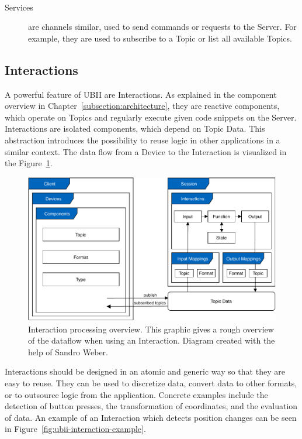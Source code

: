 \begin{description}
  \item[Services] are channels similar, used to send commands or requests to the Server. For example, they are used to subscribe to a Topic or list all available Topics.
\end{description}


\subsection{Interactions}\label{subsection:interactions}
A powerful feature of \ac{UBII} are Interactions. As explained in the component overview in Chapter~\ref{subsection:architecture}, they are reactive components, which operate on Topics and regularly execute given code snippets on the Server. Interactions are isolated components, which depend on Topic Data. This abstraction introduces the possibility to reuse logic in other applications in a similar context. The data flow from a Device to the Interaction is visualized in the Figure~\ref{fig:ubii-cd}.

\begin{figure}[H]
 \centering
 \includegraphics[width=12cm]{figures/implementation/ubii_cd.pdf}
 \caption[UBII communication diagram]{Interaction processing overview. This graphic gives a rough overview of the dataflow when using an Interaction. Diagram created with the help of Sandro Weber.}\label{fig:ubii-cd}
\end{figure}

Interactions should be designed in an atomic and generic way so that they are easy to reuse. They can be used to discretize data, convert data to other formats, or to outsource logic from the application. Concrete examples include the detection of button presses, the transformation of coordinates, and the evaluation of data. An example of an Interaction which detects position changes can be seen in Figure~\ref{fig:ubii-interaction-example}.

